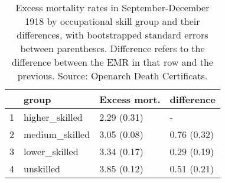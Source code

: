 \begin{table}[ht]
\centering
\begin{tabular}{rlll}
  \hline
 & group & Excess mort. & difference \\ 
  \hline
1 & higher\_skilled & 2.29 (0.31) & - \\ 
  2 & medium\_skilled & 3.05 (0.08) & 0.76 (0.32) \\ 
  3 & lower\_skilled & 3.34 (0.17) & 0.29 (0.19) \\ 
  4 & unskilled & 3.85 (0.12) & 0.51 (0.21) \\ 
   \hline
\end{tabular}
\caption{Excess mortality rates in September-December 1918 by occupational skill group and their differences, with bootstrapped standard errors between parentheses. Difference refers to the difference between the EMR in that row and the previous. Source: Openarch Death Certificats.} 
\label{lab:emr_byskill_boot}
\end{table}
